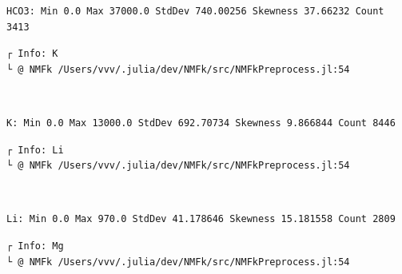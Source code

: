 \documentclass[11pt]{article}
\begin{document}
    \begin{Verbatim}[commandchars=\\\{\}]
HCO3: Min 0.0 Max 37000.0 StdDev 740.00256 Skewness 37.66232 Count 3413
    \end{Verbatim}

    \begin{Verbatim}[commandchars=\\\{\}]
┌ Info: K
└ @ NMFk /Users/vvv/.julia/dev/NMFk/src/NMFkPreprocess.jl:54
    \end{Verbatim}

    \begin{center}
    \end{center}
    { \hspace*{\fill} \\}
    
    \begin{Verbatim}[commandchars=\\\{\}]
K: Min 0.0 Max 13000.0 StdDev 692.70734 Skewness 9.866844 Count 8446
    \end{Verbatim}

    \begin{Verbatim}[commandchars=\\\{\}]
┌ Info: Li
└ @ NMFk /Users/vvv/.julia/dev/NMFk/src/NMFkPreprocess.jl:54
    \end{Verbatim}

    \begin{center}
    \end{center}
    { \hspace*{\fill} \\}
    
    \begin{Verbatim}[commandchars=\\\{\}]
Li: Min 0.0 Max 970.0 StdDev 41.178646 Skewness 15.181558 Count 2809
    \end{Verbatim}

    \begin{Verbatim}[commandchars=\\\{\}]
┌ Info: Mg
└ @ NMFk /Users/vvv/.julia/dev/NMFk/src/NMFkPreprocess.jl:54
    \end{Verbatim}

    \begin{center}
    \end{center}
    { \hspace*{\fill} \\}
    
\end{document}
